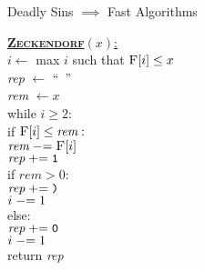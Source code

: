 \documentclass[aspectratio=169]{beamer}
\begin{document}
\begin{frame}{Deadly Sins $\implies$ Fast Algorithms}
   \begin{nalgo}[0.925]
       \underline{\textbf{\textsc{Zeckendorf}}$(x)$:}\+
    \\\label{}      $i \gets$ max $i$ such that $\textsc{F}[i] \leq x$
    \\\label{}      \textit{rep} $\gets $ ``~''
    \\\label{}      \textit{rem} $\gets x$
    \\\label{}      while $i \geq 2:$\+
    \\\label{}          if $\textsc{F}[i] \leq \textit{rem}:$\+
    \\\label{}              $\textit{rem} \mathrel{-}= \textsc{F}[i]$
    \\\label{}              $\textit{rep} \mathrel{+}= \texttt{1}$
    \\\label{}              if $\textit{rem} > 0:$\+
    \\\label{}                  $\textit{rep} \mathrel{+}= \texttt{)}$
    \\\label{}                  $i \mathrel{-}= 1$\-\-
    \\\label{}          else:\+
    \\\label{}              $\textit{rep} \mathrel{+}= \texttt{0}$\-
    \\\label{}          $i \mathrel{-}= 1$\-
    \\\label{}      return \textit{rep}
   \end{nalgo}
\end{frame}
\end{document}

